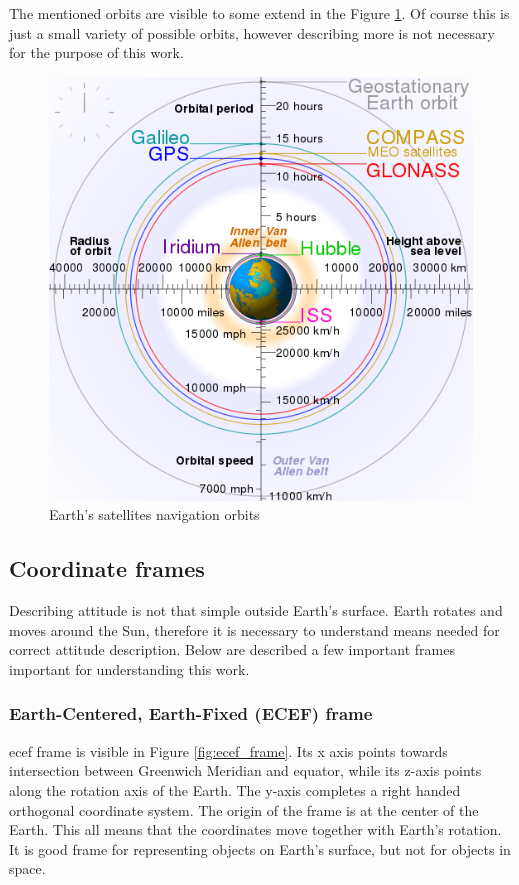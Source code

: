 \documentclass[12pt,a4paper,twoside]{article}
\begin{document}
The mentioned orbits are visible to some extend in the Figure \ref{fig:orbits-image}. Of course this is just a small variety of possible orbits, however describing more is not necessary for the purpose of this work.


\begin{figure}[!htbp]
\includegraphics[scale=0.7]{Comparison_satellite_navigation_orbits.png}
\centering
\caption[Earth's satellites navigation orbits]{Earth's satellites navigation orbits\cite{orbits-image}}
\label{fig:orbits-image}
\end{figure}


\subsection{Coordinate frames}
Describing attitude is not that simple outside Earth's surface. Earth rotates and moves around the Sun, therefore it is necessary to understand means needed for correct attitude description.
Below are described a few important frames important for understanding this work. 

\subsubsection{Earth-Centered, Earth-Fixed (ECEF) frame}
\gls{ecef} frame is visible in Figure \ref{fig:ecef_frame}. Its x axis points towards intersection between Greenwich Meridian and equator, while its z-axis points along the rotation axis of the Earth. The y-axis completes a right handed orthogonal coordinate system. The origin of the frame is at the center of the Earth.
This all means that the coordinates move together with Earth's rotation. It is good frame for representing objects on Earth's surface, but not for objects in space.
\end{document}
